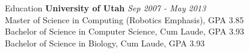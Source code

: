 \documentclass{resume} %
\begin{document}

\begin{rSection}{Education}
{\bf University of Utah} \hfill {\em Sep 2007 - May 2013} \\
Master of Science in Computing (Robotics Emphasis), GPA 3.85 \\
Bachelor of Science in Computer Science, Cum Laude, GPA 3.93 \\
Bachelor of Science in Biology, Cum Laude, GPA 3.93 \\
\end{rSection}

\end{document}
